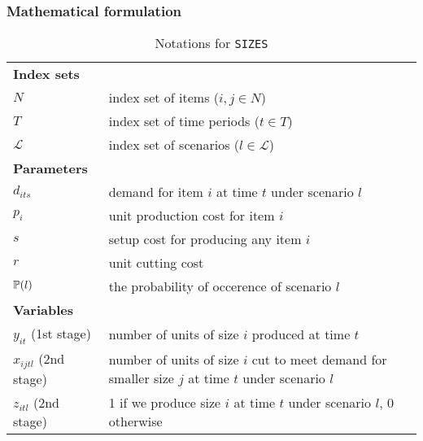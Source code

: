 \subsubsection{Mathematical formulation}
\begin{table}[H]
	\caption{Notations for \texttt{SIZES}}
	\label{notation}
	\resizebox{\textwidth}{!}
	{
		\begin{tabular}{ll}
			\toprule
			\textbf{Index sets} &  \\ 
			$N$ & \textrm{index set of items ($i,j\in N$)} \\ 
			$T$ & \textrm{index set of time periods ($t\in T$)} \\ 
			$\mathcal{L}$ & \textrm{index set of scenarios ($l\in\mathcal{L}$)}\\
			\textbf{Parameters} &   \\ 
			$d_{its}$ &	demand for item $i$ at time $t$ under scenario $l$\\
			$p_{i}$ & unit production cost for item $i$\\
			$s$	& setup cost for producing any item $i$\\
			$r$ & unit cutting cost\\ 
			$\operatorname*{\mathbb{P}}(l)$ & the probability of occerence of scenario $l$\\
			\textbf{Variables} &  \\ 
			$y_{it}$ (1st stage) & number of units of size $i$ produced at time $t$ \\
			$x_{ijtl}$ (2nd stage)& number of units of size $i$ cut to meet demand for smaller size $j$ at time $t$ under scenario $l$\\ 
			$z_{itl}$ (2nd stage)& 1 if we produce size $i$ at time $t$ under scenario $l$, 0 otherwise\\
			\hline
		\end{tabular}
	}
\end{table} 

